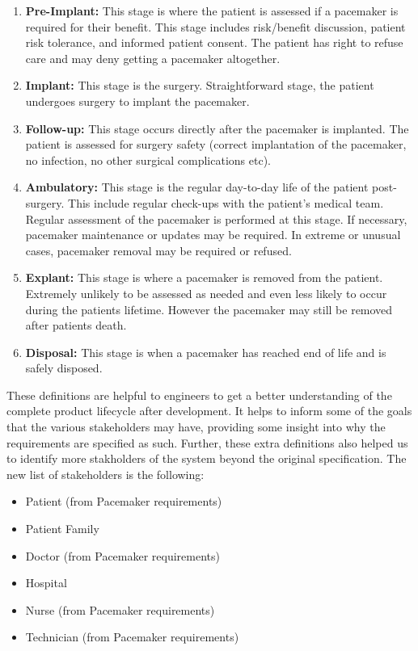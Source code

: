 \begin{enumerate}
	\item \textbf{Pre-Implant:} This stage is where the patient is assessed if a pacemaker is required for their benefit. This stage includes risk/benefit discussion, patient risk tolerance, and informed patient consent. The patient has right to refuse care and may deny getting a pacemaker altogether. 
	\item \textbf{Implant:} This stage is the surgery. Straightforward stage, the patient undergoes surgery to implant the pacemaker.
	\item \textbf{Follow-up:} This stage occurs directly after the pacemaker is implanted. The patient is assessed for surgery safety (correct implantation of the pacemaker, no infection, no other surgical complications etc).
	\item \textbf{Ambulatory:} This stage is the regular day-to-day life of the patient post-surgery. This include regular check-ups with the patient's medical team. Regular assessment of the pacemaker is performed at this stage. If necessary, pacemaker maintenance or updates may be required. In extreme or unusual cases, pacemaker removal may be required or refused.
	\item \textbf{Explant:} This stage is where a pacemaker is removed from the patient. Extremely unlikely to be assessed as needed and even less likely to occur during the patients lifetime. However the pacemaker may still be removed after patients death.
	\item \textbf{Disposal:} This stage is when a pacemaker has reached end of life and is safely disposed.
\end{enumerate}

These definitions are helpful to engineers to get a better understanding of the complete product lifecycle after development. It helps to inform some of the goals that the various stakeholders may have, providing some insight into why the requirements are specified as such. Further, these extra definitions also helped us to identify more stakholders of the system beyond the original specification. The new list of stakeholders is the following:

\begin{itemize}
	\item Patient (from Pacemaker requirements)
	\item Patient Family
	\item Doctor (from Pacemaker requirements)
	\item Hospital
	\item Nurse (from Pacemaker requirements)
	\item Technician (from Pacemaker requirements)
\end{itemize}

